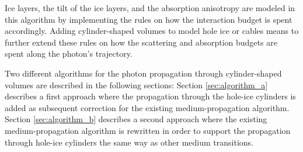 Ice layers, the tilt of the ice layers, and the absorption anisotropy
are modeled in this algorithm by implementing the rules on how the
interaction budget is spent accordingly. Adding cylinder-shaped volumes
to model hole ice or cables means to further extend these rules on how
the scattering and absorption budgets are spent along the photon's
trajectory.

Two different algorithms for the photon propagation through
cylinder-shaped volumes are described in the following sections: Section
\ref{sec:algorithm_a} describes a first approach where the propagation
through the hole-ice cylinders is added as subsequent correction for the
existing medium-propagation algorithm. Section \ref{sec:algorithm_b}
describes a second approach where the existing medium-propagation
algorithm is rewritten in order to support the propagation through
hole-ice cylinders the same way as other medium transitions.
